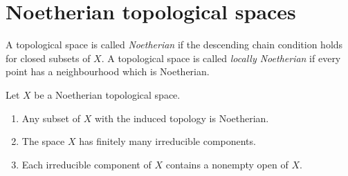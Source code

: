 \section{Noetherian topological spaces}
\label{section-noetherian}

\begin{definition}
\label{definition-noetherian}
A topological space is called {\it Noetherian}
if the descending chain condition holds for
closed subsets of $X$. A topological space is called
{\it locally Noetherian} if every point has a neighbourhood
which is Noetherian.
\end{definition}

\begin{lemma}
\label{lemma-Noetherian}
Let $X$ be a Noetherian topological space.
\begin{enumerate}
\item Any subset of $X$ with the induced topology is Noetherian.
\item The space $X$ has finitely many irreducible components.
\item Each irreducible component of $X$ contains a nonempty open of $X$.
\end{enumerate}
\end{lemma}

